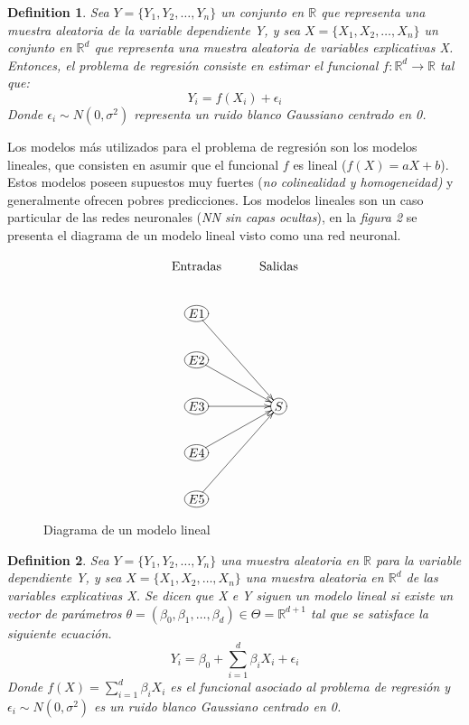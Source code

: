 \documentclass[nojss]{jss}
\newtheorem{Def}{Definition}
\begin{document}
\begin{Def}
	Sea $Y = \{Y_1,Y_2,\ldots,Y_n\}$ un conjunto en $\mathbb{R}$ que representa una muestra aleatoria de la variable dependiente Y, y sea $X = \{X_1,X_2,\ldots,X_n\}$ un conjunto en $\mathbb{R}^d$ que representa una muestra aleatoria de variables explicativas X. Entonces, el problema de regresión consiste en estimar el funcional $f:\mathbb{R}^d \rightarrow \mathbb{R}$ tal que:
	$$Y_i = f(X_i) +\epsilon_i$$
	Donde $\epsilon_i \sim N(0,\sigma^2)$ representa un ruido blanco Gaussiano centrado en 0.
\end{Def}

Los modelos más utilizados para  el problema de regresión son los modelos lineales, que consisten en asumir que el funcional $f$ es lineal ($f(X) = aX +b$). Estos modelos poseen supuestos muy fuertes (\textit{no colinealidad y homogeneidad)} y generalmente ofrecen pobres predicciones. Los modelos lineales son un caso particular de las redes neuronales (\textit{NN sin capas ocultas}), en la \textit{figura 2} se presenta el diagrama de un modelo lineal visto como una red neuronal.


\begin{figure}[H]
 \centering
 $$
 \xymatrix{
  \text{Entradas}     &\text{Salidas}\\
  *+[o][F]{E1}\ar[ddr]& \\
  *+[o][F]{E2}\ar[dr] & \\
  *+[o][F]{E3}\ar[r]  & *+[o][F]{S}\\
  *+[o][F]{E4}\ar[ur] & \\	
  *+[o][F]{E5}\ar[uur]& \\		
 }
 $$
 \caption[Modelo lineal]{Diagrama de un modelo lineal}
 \label{fig:fig2}
\end{figure}
 
\begin{Def}
	Sea $Y = \{Y_1,Y_2,\ldots,Y_n\}$ una muestra aleatoria en $\mathbb{R}$ para la variable dependiente Y, y sea $X = \{X_1,X_2,\ldots,X_n\}$ una muestra aleatoria en $\mathbb{R}^d$ de las variables explicativas X. Se dicen que X e Y siguen un modelo lineal si existe un vector de parámetros $\theta = (\beta_0,\beta_1, \ldots,\beta_d) \in\Theta = \mathbb{R}^{d+1}$ tal que se satisface la siguiente ecuación.
	$$Y_i = \beta_0 + \sum_{i=1}^d \beta_i X_i +\epsilon_i$$
	Donde $f(X) = \sum_{i=1}^d\beta_iX_i$ es el funcional asociado al problema de regresión y $\epsilon_i \sim N(0,\sigma^2)$ es un ruido blanco Gaussiano centrado en 0.
\end{Def}
 
\end{document}
